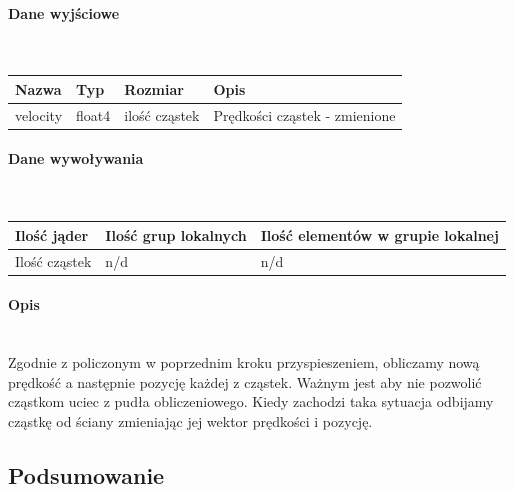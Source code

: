 \documentclass[polish, 12pt]{aghthesis}
\begin{document}
				\paragraph{Dane wyjściowe} \ \\
					\begin{tabular}{| p{} | p{} | p{} | p{} |}
					\hline
						Nazwa & Typ & Rozmiar & Opis \\
					\hline
						velocity & float4 & ilość cząstek & Prędkości cząstek - zmienione \\
					\hline
				\end{tabular}
				\paragraph{Dane wywoływania} \ \\
					\begin{tabular}{| p{} | p{} | p{}|}
					\hline
						Ilość jąder & Ilość grup lokalnych & Ilość elementów w grupie lokalnej \\
					\hline
						Ilość cząstek & n/d & n/d \\ 
					\hline
					\end{tabular}
				\paragraph{Opis} \ \\
					\indent Zgodnie z policzonym w poprzednim kroku przyspieszeniem, obliczamy nową prędkość a następnie pozycję każdej z cząstek. Ważnym jest aby nie pozwolić cząstkom uciec z pudła obliczeniowego. Kiedy zachodzi taka sytuacja odbijamy cząstkę od ściany zmieniając jej wektor prędkości i pozycję.
					
		\subsection{Podsumowanie}
		
\end{document}
